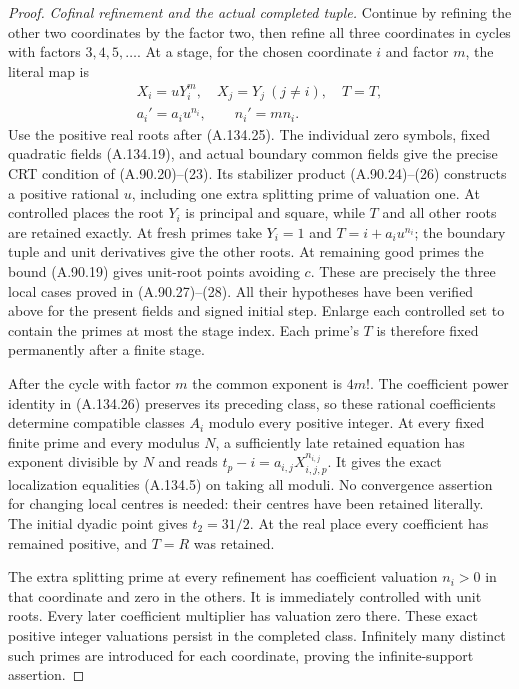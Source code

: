 \begin{proof}
\emph{Cofinal refinement and the actual completed tuple.}
Continue by refining the other two coordinates
by the factor two, then refine all three
coordinates in cycles with factors
$3,4,5,\ldots$.
At a stage, for the chosen coordinate $i$ and
factor $m$, the literal map is
\[
 \begin{gathered}
 X_i=uY_i^m,\quad X_j=Y_j\ (j\ne i),\quad T=T,\\
                    a_i'=a_i u^{n_i},\qquad n_i'=mn_i.
 \end{gathered}
\tag{A.134.26}
\]
Use the positive real roots after (A.134.25).
The individual zero symbols, fixed quadratic
fields (A.134.19), and actual boundary common
fields give the precise CRT condition of
(A.90.20)--(23).
Its stabilizer product (A.90.24)--(26) constructs
a positive rational $u$, including one extra
splitting prime of valuation one.
At controlled places the root $Y_i$ is principal
and square, while $T$ and all other roots are
retained exactly.
At fresh primes take $Y_i=1$ and
$T=i+a_i u^{n_i}$; the boundary tuple and unit
derivatives give the other roots.
At remaining good primes the bound
(A.90.19) gives unit-root points avoiding $c$.
These are precisely the three local cases
proved in (A.90.27)--(28).
All their hypotheses have been verified above
for the present fields and signed initial step.
Enlarge each controlled set to contain the
primes at most the stage index.
Each prime's $T$ is therefore fixed permanently
after a finite stage.

After the cycle with factor $m$ the common
exponent is $4m!$.
The coefficient power identity in (A.134.26)
preserves its preceding class, so these
rational coefficients determine compatible
classes $A_i$ modulo every positive integer.
At every fixed finite prime and every modulus
$N$, a sufficiently late retained equation has
exponent divisible by $N$ and reads
$t_p-i=a_{i,j}X_{i,j,p}^{n_{i,j}}$.
It gives the exact localization equalities
(A.134.5) on taking all moduli.
No convergence assertion for changing local
centres is needed: their centres have been
retained literally.
The initial dyadic point gives $t_2=31/2$.
At the real place every coefficient has
remained positive, and $T=R$ was retained.

The extra splitting prime at every refinement
has coefficient valuation $n_i>0$ in that
coordinate and zero in the others.
It is immediately controlled with unit roots.
Every later coefficient multiplier has valuation
zero there.
These exact positive integer valuations persist
in the completed class.
Infinitely many distinct such primes are
introduced for each coordinate, proving the
infinite-support assertion.


\end{proof}
